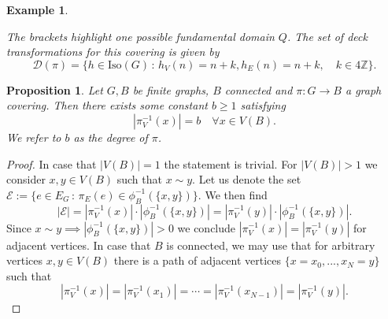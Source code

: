 \documentclass{article}
\newtheorem{proposition}[theorem]{Proposition}
\newtheorem{example}[theorem]{Example}
\newcommand{\Iso}{\mathrm{Iso}}
\begin{document}
\begin{example}
\begin{center}
    \end{center}
    The brackets highlight one possible fundamental domain $Q$. The set of deck transformations for this covering is given by
    \begin{equation}
        \mathcal{D}(\pi)=\{h\in\Iso(G)\,:\,h_V(n)=n+k,h_E(n)=n+k,\quad k\in 4\mathds{Z}\}.
    \end{equation}
\end{example}

\begin{proposition}
    Let $G,B$ be finite graphs, $B$ connected and $\pi:G\to B$ a graph covering. Then there exists some constant $b\geq1$ satisfying
    \begin{equation}
        |\pi_V^{-1}(x)|=b\quad\forall x\in V(B).
    \end{equation}
    We refer to $b$ as the degree of $\pi$.
\end{proposition}

\begin{proof}
    In case that $|V(B)|=1$ the statement is trivial. For $|V(B)|>1$ we consider $x,y\in V(B)$ such that $x\sim y$. Let us denote the set $\mathcal{E}:=\{e\in E_G\,:\,\pi_E(e)\in\phi_B^{-1}(\{x,y\})\}$. We then find
    \begin{equation}
        |\mathcal{E}|=|\pi_V^{-1}(x)|\cdot|\phi_B^{-1}(\{x,y\})|=|\pi_V^{-1}(y)|\cdot|\phi_B^{-1}(\{x,y\})|.
    \end{equation}
    Since $x\sim y\implies|\phi_B^{-1}(\{x,y\})|>0$ we conclude $|\pi_V^{-1}(x)|=|\pi_V^{-1}(y)|$ for adjacent vertices. In case that $B$ is connected, we may use that for arbitrary vertices $x,y\in V(B)$ there is a path of adjacent vertices $\{x=x_0,...,x_N=y\}$ such that
    \begin{equation}
        |\pi_V^{-1}(x)|=|\pi_V^{-1}(x_1)|=\cdots=|\pi_V^{-1}(x_{N-1})|=|\pi_V^{-1}(y)|.
    \end{equation}
\end{proof}
\end{document}
